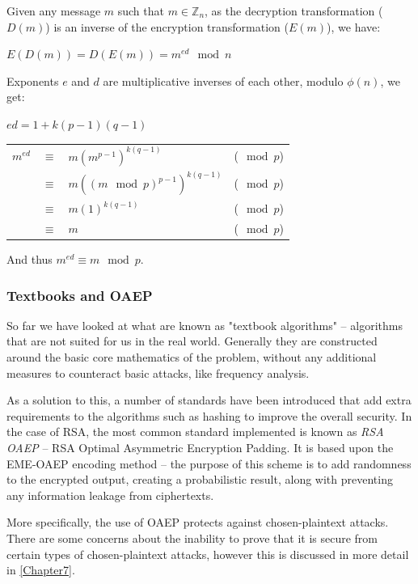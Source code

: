     Given any message $m$ such that $m \in \mathbb{Z}_n$, as the decryption transformation ($D(m)$) is an inverse of the encryption transformation ($E(m)$), we have: 
    \begin{center}
      $E(D(m)) = D(E(m)) = m^{ed} \mod n$
    \end{center}
    
    Exponents $e$ and $d$ are multiplicative inverses of each other, modulo $\phi(n)$, we get:
    \begin{center}
      $ed = 1 + k(p-1)(q-1)$
    \end{center}
    
    \begin{center}
      \begin{tabular}{ l l l l }
        $m^{ed}$ & $\equiv$ & $m(m^{p-1})^{k(q-1)}$ & ($\mod p$) \\
         & $\equiv$ & $m((m \mod p)^{p-1})^{k(q-1)}$ & ($\mod p$) \\
         & $\equiv$ & $m(1)^{k(q-1)}$ & ($\mod p$) \\
         & $\equiv$ & $m$ & ($\mod p$)
      \end{tabular}
    \end{center}
    
    And thus $m^{ed} \equiv m \mod p$.
    
    \subsubsection{Textbooks and OAEP}
    \label{subsubsec:oaep}
    
    So far we have looked at what are known as "textbook algorithms" -- algorithms that are not suited for us in the real world. Generally they are constructed around the basic core mathematics of the problem, without any additional measures to counteract basic attacks, like frequency analysis. 
    
    As a solution to this, a number of standards have been introduced that add extra requirements to the algorithms such as hashing to improve the overall security. In the case of RSA, the most common standard implemented is known as \emph{RSA OAEP} -- RSA Optimal Asymmetric Encryption Padding\cite{Bellare:1995aa}. It is based upon the EME-OAEP encoding method -- the purpose of this scheme is to add randomness to the encrypted output, creating a probabilistic result, along with preventing any information leakage from ciphertexts.
    
    More specifically, the use of OAEP protects against chosen-plaintext attacks. There are some concerns about the inability to prove that it is secure from certain types of chosen-plaintext attacks, however this is discussed in more detail in \textsection\ref{Chapter7}.
    
